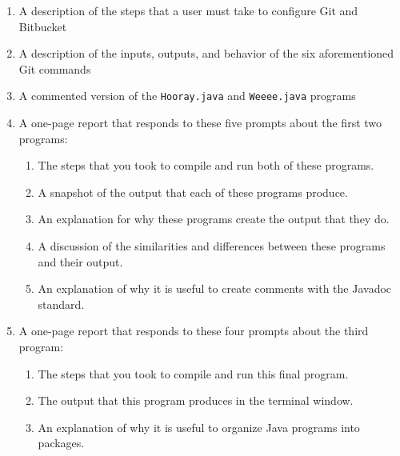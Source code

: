 \vspace*{-.05in}
\begin{enumerate}

  \itemsep 0em
  \item A description of the steps that a user must take to configure Git and Bitbucket
  \item A description of the inputs, outputs, and behavior of the six aforementioned Git commands
  \item A commented version of the {\tt Hooray.java} and {\tt Weeee.java} programs

  \item A one-page report that responds to these five prompts about the first two programs:

    \vspace*{-.05in}
    \begin{enumerate}
      \itemsep 0em

      \item The steps that you took to compile and run both of these programs.

      \item A snapshot of the output that each of these programs produce.

      \item An explanation for why these programs create the output that they do.

      \item A discussion of the similarities and differences between these programs and their output.

      \item An explanation of why it is useful to create comments with the Javadoc standard.

    \end{enumerate}

  \item A one-page report that responds to these four prompts about the third program:

    \vspace*{-.05in}
    \begin{enumerate}
      \itemsep 0em

      \item The steps that you took to compile and run this final program.

      \item The output that this program produces in the terminal window.

      \item An explanation of why it is useful to organize Java programs into packages.


\end{enumerate}
\end{enumerate}
